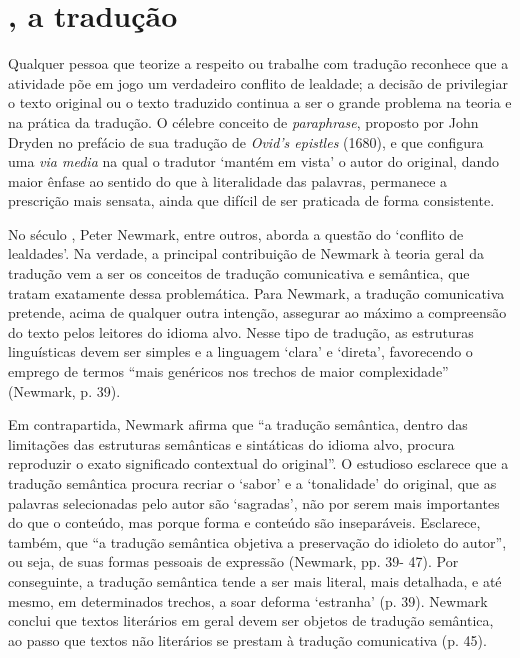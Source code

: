 \section{, a tradução}

Qualquer pessoa que teorize a respeito ou trabalhe com tradução
reconhece que a atividade põe em jogo um verdadeiro conflito de
lealdade; a decisão de privilegiar o texto original ou o texto
traduzido continua a ser o grande problema na teoria e na prática da
tradução. O célebre conceito de \textit{paraphrase}, proposto por John Dryden
no prefácio de sua tradução de \textit{Ovid's epistles} (1680), e que configura
uma \textit{via media} na qual o tradutor `mantém em vista' o autor do
original, dando maior ênfase ao sentido do que à literalidade das
palavras, permanece a prescrição mais sensata, ainda que difícil de ser
praticada de forma consistente.

No século , Peter Newmark, entre outros, aborda a questão do
`conflito de lealdades'. Na verdade, a principal contribuição de
Newmark à teoria geral da tradução vem a ser os conceitos de tradução
comunicativa e semântica, que tratam exatamente dessa problemática.
Para Newmark, a tradução comunicativa pretende, acima de qualquer
outra intenção, assegurar ao máximo a compreensão do texto pelos
leitores do idioma alvo. Nesse tipo de tradução, as estruturas
linguísticas devem ser simples e a linguagem `clara' e
`direta', favorecendo o emprego de termos ``mais genéricos nos
trechos de maior complexidade'' (Newmark, p. 39).

Em contrapartida, Newmark afirma que ``a tradução semântica,
dentro das limitações das estruturas semânticas e sintáticas do idioma
alvo, procura reproduzir o exato significado contextual do
original''. O estudioso esclarece que a tradução semântica procura
recriar o `sabor' e a `tonalidade' do original, que as palavras
selecionadas pelo autor são `sagradas', não por serem mais
importantes do que o conteúdo, mas porque forma e conteúdo são
inseparáveis. Esclarece, também, que ``a tradução semântica
objetiva a preservação do idioleto do autor'', ou seja, de suas
formas pessoais de expressão (Newmark, pp. 39- 47). Por conseguinte, a
tradução semântica tende a ser mais literal, mais detalhada, e até
mesmo, em determinados trechos, a soar deforma `estranha' (p. 39).
Newmark conclui que textos literários em geral devem ser objetos de
tradução semântica, ao passo que textos não literários se prestam à
tradução comunicativa (p. 45).

